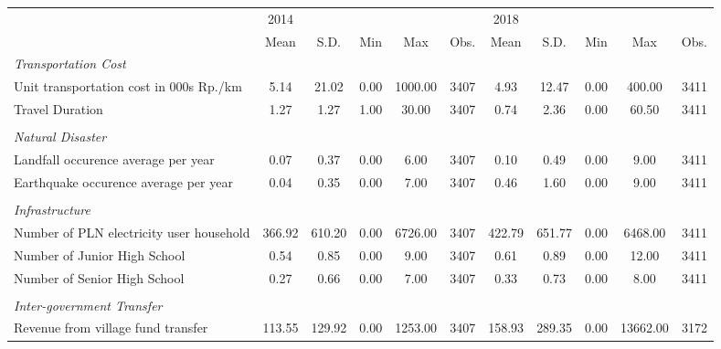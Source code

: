 \begin{tabular}{l*{2}{ccccc}}
\toprule
                &     2014&         &         &         &         &     2018&         &         &         &         \\
                &     Mean&     S.D.&      Min&      Max&     Obs.&     Mean&     S.D.&      Min&      Max&     Obs.\\
\midrule
\emph{Transportation Cost}&         &         &         &         &         &         &         &         &         &         \\
\hspace{0.25cm} Unit transportation cost in 000s Rp./km&     5.14&    21.02&     0.00&  1000.00&     3407&     4.93&    12.47&     0.00&   400.00&     3411\\
\hspace{0.25cm} Travel Duration&     1.27&     1.27&     1.00&    30.00&     3407&     0.74&     2.36&     0.00&    60.50&     3411\\
\vspace{0.05em} \\ \emph{Natural Disaster}&         &         &         &         &         &         &         &         &         &         \\
\hspace{0.25cm} Landfall occurence average per year&     0.07&     0.37&     0.00&     6.00&     3407&     0.10&     0.49&     0.00&     9.00&     3411\\
\hspace{0.25cm} Earthquake occurence average per year&     0.04&     0.35&     0.00&     7.00&     3407&     0.46&     1.60&     0.00&     9.00&     3411\\
\vspace{0.05em} \\ \emph{Infrastructure}&         &         &         &         &         &         &         &         &         &         \\
\hspace{0.25cm} Number of PLN electricity user household&   366.92&   610.20&     0.00&  6726.00&     3407&   422.79&   651.77&     0.00&  6468.00&     3411\\
\hspace{0.25cm} Number of Junior High School&     0.54&     0.85&     0.00&     9.00&     3407&     0.61&     0.89&     0.00&    12.00&     3411\\
\hspace{0.25cm} Number of Senior High School&     0.27&     0.66&     0.00&     7.00&     3407&     0.33&     0.73&     0.00&     8.00&     3411\\
\vspace{0.05em} \\ \emph{Inter-government Transfer}&         &         &         &         &         &         &         &         &         &         \\
\hspace{0.25cm} Revenue from village fund transfer&   113.55&   129.92&     0.00&  1253.00&     3407&   158.93&   289.35&     0.00& 13662.00&     3172\\
\bottomrule
\end{tabular}
